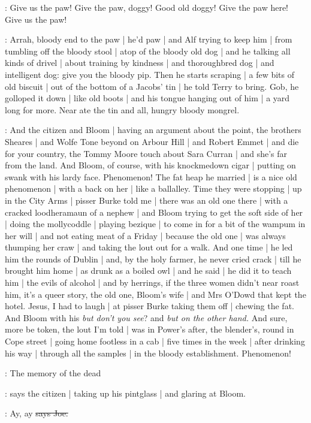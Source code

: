 \doran:
Give us the paw!
Give the paw,
doggy!
Good old doggy!
Give the paw here!
Give us the paw!

\Nq:
Arrah,
bloody end to the paw |
he'd paw |
and Alf trying to keep him |
from tumbling off the bloody stool |
atop of the bloody old dog |
and he talking all kinds of drivel |
about training by kindness |
and thoroughbred dog |
and intelligent dog:
give you the bloody pip.
Then he starts scraping |
a few bits of old biscuit |
out of the bottom of a Jacobs' tin |
he told Terry to bring.
Gob,
he golloped it down |
like old boots |
and his tongue hanging out of him |
a yard long for more.
Near ate the tin and all,
hungry bloody mongrel.

\Nq:
And the citizen and Bloom |
having an argument about the point,
the brothers Sheares |
and Wolfe Tone beyond on Arbour Hill |
and Robert Emmet |
and die for your country,
the Tommy Moore touch about Sara Curran |
and she's far from the land.
And Bloom,
of course,
with his knockmedown cigar |
putting on swank with his lardy face.
Phenomenon!
The fat heap he married |
is a nice old phenomenon |
with a back on her |
like a ballalley.
Time they were stopping |
up in the City Arms |
pisser Burke told me |
there was an old one there |
with a cracked loodheramaun of a nephew |
and Bloom trying to get the soft side of her |
doing the mollycoddle |
playing bezique |
to come in for a bit of the wampum in her will |
and not eating meat of a Friday |
because the old one |
was always thumping her craw |
and taking the lout out for a walk.
And one time |
he led him the rounds of Dublin |
and,
by the holy farmer,
he never cried crack |
till he brought him home |
as drunk as a boiled owl |
and he said |
he did it to teach him |
the evils of alcohol |
and by herrings,
if the three women didn't near roast him,
it's a queer story,
the old one,
Bloom's wife |
and Mrs O'Dowd that kept the hotel.
Jesus,
I had to laugh |
at pisser Burke taking them off |
chewing the fat.
And Bloom with his \emph{but don't you see}?
and \emph{but on the other hand.}
And sure,
more be token,
the lout I'm told |
was in Power's after,
the blender's,
round in Cope street |
going home footless in a cab |
five times in the week |
after drinking his way |
through all the samples |
in the bloody establishment.
Phenomenon!

\citizen:
The memory of the dead

\Nq:
says the citizen |
taking up his pintglass |
and glaring at Bloom.%

\joe:
Ay,
ay
\sout{says Joe.}

